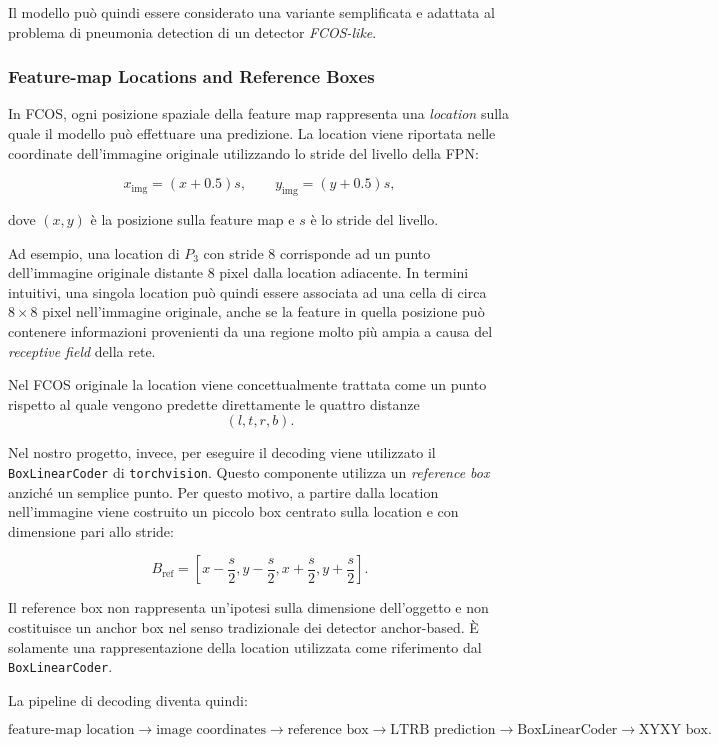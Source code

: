 Il modello può quindi essere considerato una variante semplificata e adattata
al problema di pneumonia detection di un detector \textit{FCOS-like}.


\subsubsection{Feature-map Locations and Reference Boxes}

In FCOS, ogni posizione spaziale della feature map rappresenta una
\textit{location} sulla quale il modello può effettuare una predizione. La
location viene riportata nelle coordinate dell'immagine originale utilizzando
lo stride del livello della FPN:

\[
x_{\text{img}}=(x+0.5)s,
\qquad
y_{\text{img}}=(y+0.5)s,
\]

dove $(x,y)$ è la posizione sulla feature map e $s$ è lo stride del livello.

Ad esempio, una location di $P_3$ con stride $8$ corrisponde ad un punto
dell'immagine originale distante $8$ pixel dalla location adiacente. In
termini intuitivi, una singola location può quindi essere associata ad una
cella di circa $8\times8$ pixel nell'immagine originale, anche se la feature
in quella posizione può contenere informazioni provenienti da una regione
molto più ampia a causa del \textit{receptive field} della rete.

Nel FCOS originale la location viene concettualmente trattata come un punto
rispetto al quale vengono predette direttamente le quattro distanze
\[
(l,t,r,b).
\]

Nel nostro progetto, invece, per eseguire il decoding viene utilizzato il
\texttt{BoxLinearCoder} di \texttt{torchvision}. Questo componente utilizza un
\textit{reference box} anziché un semplice punto. Per questo motivo, a partire
dalla location nell'immagine viene costruito un piccolo box centrato sulla
location e con dimensione pari allo stride:

\[
B_{\text{ref}} =
\left[
x-\frac{s}{2},
y-\frac{s}{2},
x+\frac{s}{2},
y+\frac{s}{2}
\right].
\]

Il reference box non rappresenta un'ipotesi sulla dimensione dell'oggetto e
non costituisce un anchor box nel senso tradizionale dei detector
anchor-based. È solamente una rappresentazione della location utilizzata come
riferimento dal \texttt{BoxLinearCoder}.

La pipeline di decoding diventa quindi:

\[
\text{feature-map location}
\rightarrow
\text{image coordinates}
\rightarrow
\text{reference box}
\rightarrow
\text{LTRB prediction}
\rightarrow
\text{BoxLinearCoder}
\rightarrow
\text{XYXY box}.
\]